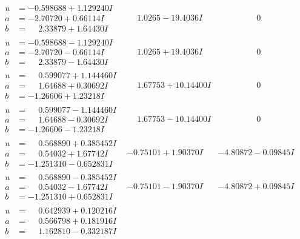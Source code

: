 \documentclass[1p]{elsarticle_modified}
\theoremstyle{definition}
\begin{document}
$$\begin{array}{c|c|c}
\begin{aligned}
u &= -0.598688 + 1.129240 I \\
a &= -2.70720 + 0.66114 I \\
b &= \phantom{-}2.33879 + 1.64430 I\end{aligned}
 & \phantom{-}1.0265 - 19.4036 I & \phantom{-0.000000 } 0 \\ \hline\begin{aligned}
u &= -0.598688 - 1.129240 I \\
a &= -2.70720 - 0.66114 I \\
b &= \phantom{-}2.33879 - 1.64430 I\end{aligned}
 & \phantom{-}1.0265 + 19.4036 I & \phantom{-0.000000 } 0 \\ \hline\begin{aligned}
u &= \phantom{-}0.599077 + 1.144460 I \\
a &= \phantom{-}1.64688 + 0.30692 I \\
b &= -1.26606 + 1.23218 I\end{aligned}
 & \phantom{-}1.67753 + 10.14400 I & \phantom{-0.000000 } 0 \\ \hline\begin{aligned}
u &= \phantom{-}0.599077 - 1.144460 I \\
a &= \phantom{-}1.64688 - 0.30692 I \\
b &= -1.26606 - 1.23218 I\end{aligned}
 & \phantom{-}1.67753 - 10.14400 I & \phantom{-0.000000 } 0 \\ \hline\begin{aligned}
u &= \phantom{-}0.568890 + 0.385452 I \\
a &= \phantom{-}0.54032 + 1.67742 I \\
b &= -1.251310 - 0.652831 I\end{aligned}
 & -0.75101 + 1.90370 I & -4.80872 - 0.09845 I \\ \hline\begin{aligned}
u &= \phantom{-}0.568890 - 0.385452 I \\
a &= \phantom{-}0.54032 - 1.67742 I \\
b &= -1.251310 + 0.652831 I\end{aligned}
 & -0.75101 - 1.90370 I & -4.80872 + 0.09845 I \\ \hline\begin{aligned}
u &= \phantom{-}0.642939 + 0.120216 I \\
a &= \phantom{-}0.566798 + 0.181916 I \\
b &= \phantom{-}1.162810 - 0.332187 I\end{aligned}

\end{array}$$
\end{document}
